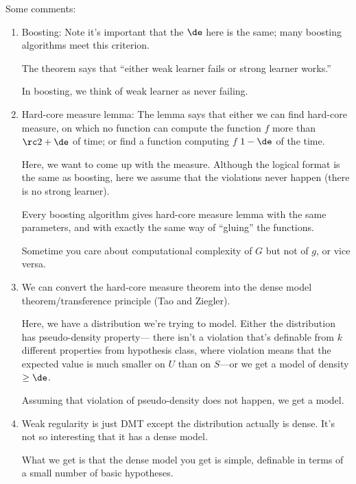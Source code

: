 Some comments:
\begin{enumerate}
\item
Boosting: %
Note it's important that the $\de$ here is the same; many boosting algorithms meet this criterion.

The theorem says that ``either weak learner fails or strong learner works.'' 

In boosting, we think of weak learner as never failing.
\item
Hard-core measure lemma:  The lemma says that either we can find hard-core measure, on which no function can compute the function $f$ more than $\rc2+\de$ of time; or find a function computing $f$ $1-\de$ of the time.

Here, we want to come up with the measure. Although the logical format is the same as boosting, here we assume that the violations never happen (there is no strong learner).

Every boosting algorithm gives hard-core measure lemma with the same parameters, and with exactly the same way of ``gluing'' the functions. 

Sometime you care about computational complexity of $G$ but not of $g$, or vice versa. 
\item
We can convert the hard-core measure theorem into the dense model theorem/transference principle (Tao and Ziegler).

Here, we have a distribution we're trying to model. 
Either the distribution has pseudo-density property--- there isn't a violation that's definable from $k$ different properties from hypothesis class, where violation means that the expected value is much smaller on $U$ than on $S$---or we get a model of density $\ge \de$. %

Assuming that violation of pseudo-density does not happen, we get a model.
\item
Weak regularity is just DMT except the distribution actually is dense. It's not so interesting that it has a dense model. 

What we get is that the dense model you get is simple, definable in terms of a small number of basic hypotheses. 


\end{enumerate}
